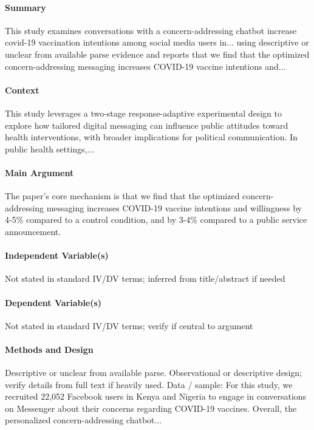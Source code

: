 \documentclass[12pt]{article}
\begin{document}
\paragraph{Summary} This study examines conversations with a concern-addressing chatbot increase covid-19 vaccination intentions among social media users in... using descriptive or unclear from available parse evidence and reports that we find that the optimized concern-addressing messaging increases COVID-19 vaccine intentions and...

\paragraph{Context} This study leverages a two-stage response-adaptive experimental design to explore how tailored digital messaging can influence public attitudes toward health interventions, with broader implications for political communication. In public health settings,...

\paragraph{Main Argument} The paper's core mechanism is that we find that the optimized concern-addressing messaging increases COVID-19 vaccine intentions and willingness by 4-5\% compared to a control condition, and by 3-4\% compared to a public service announcement.

\paragraph{Independent Variable(s)} Not stated in standard IV/DV terms; inferred from title/abstract if needed

\paragraph{Dependent Variable(s)} Not stated in standard IV/DV terms; verify if central to argument

\paragraph{Methods and Design} Descriptive or unclear from available parse. Observational or descriptive design; verify details from full text if heavily used. Data / sample: For this study, we recruited 22,052 Facebook users in Kenya and Nigeria to engage in conversations on Messenger about their concerns regarding COVID-19 vaccines. Overall, the personalized concern-addressing chatbot...
\end{document}
